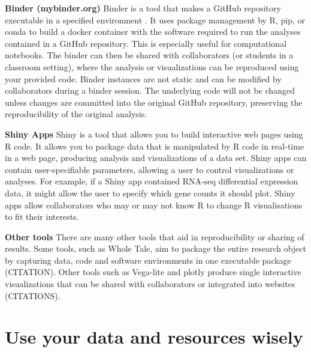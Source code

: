 \documentclass[10pt,letterpaper]{article}
\begin{document}

\begin{greybox}{
 \textbf{Binder (mybinder.org)} Binder is a tool that makes a GitHub repository executable in a specified environment \cite{Jupyter2018}. 
It uses package management by R, pip, or conda to build a docker container with the software required to run the analyses contained in a GitHub repository. 
This is especially useful for computational notebooks. 
The binder can then be shared with collaborators (or students in a classroom setting), where the analysis or visualizations can be reproduced using your provided code. 
Binder instances are not static and can be modified by collaborators during a binder session. 
The underlying code will not be changed unless changes are committed into the original GitHub repository, preserving the reproducibility of the original analysis.
 
 \textbf{Shiny Apps} Shiny is a tool that allows you to build interactive web pages using R code. 
It allows you to package data that is manipulated  by R code in real-time in a web page, producing analysis and visualizations of a data set. 
Shiny apps can contain user-specifiable parameters, allowing a user to control visualizations or analyses. 
For example, if a Shiny app contained RNA-seq differential expression data, it might allow the user to specify which gene counts it should plot. 
Shiny apps allow collaborators who may or may not know R to change R visualisations to fit their interests.   
 
 \textbf{Other tools} There are many other tools that aid in reproducibility or sharing of results. 
Some tools, such as Whole Tale, aim to package the entire research object by capturing data, code and software environments in one executable package (CITATION). 
Other tools such as Vega-lite and plotly produce single interactive visualizations that can be shared with collaborators or integrated into websites (CITATIONS).
}
\end{greybox}

\section*{Use your data and resources wisely}
\end{document}
